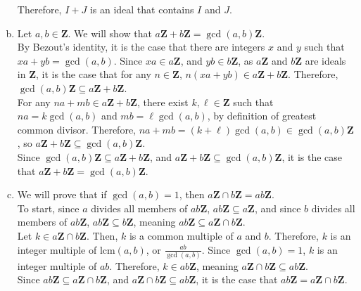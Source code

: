 \documentclass[9pt]{extarticle}
\begin{document}
\begin{enumerate}[(a)]
      Therefore, $I+J$ is an ideal that contains $I$ and $J$.
    \item Let $a,b\in\mathbf{Z}$. We will show that $a\mathbf{Z} + b\mathbf{Z} = \gcd(a,b)\mathbf{Z}$.\\

      By Bezout's identity, it is the case that there are integers $x$ and $y$ such that $xa + yb = \gcd(a,b)$. Since $xa\in a\mathbf{Z}$, and $yb\in b\mathbf{Z}$, as $a\mathbf{Z}$ and $b\mathbf{Z}$ are ideals in $\mathbf{Z}$, it is the case that for any $n\in\mathbf{Z}$, $n(xa + yb) \in a\mathbf{Z} + b\mathbf{Z}$. Therefore, $\gcd(a,b)\mathbf{Z}\subseteq a\mathbf{Z} + b\mathbf{Z}$.\\

      For any $na + mb\in a\mathbf{Z} + b\mathbf{Z}$, there exist $k,\ell\in \mathbf{Z}$ such that $na = k\gcd(a,b)$ and $mb = \ell\gcd(a,b)$, by definition of greatest common divisor. Therefore, $na + mb = (k+\ell)\gcd(a,b)\in \gcd(a,b)\mathbf{Z}$, so $a\mathbf{Z}+b\mathbf{Z}\subseteq \gcd(a,b)\mathbf{Z}$.\\

      Since $\gcd(a,b)\mathbf{Z}\subseteq a\mathbf{Z} + b\mathbf{Z}$, and $a\mathbf{Z} + b\mathbf{Z}\subseteq \gcd(a,b)\mathbf{Z}$, it is the case that $a\mathbf{Z} + b\mathbf{Z} = \gcd(a,b)\mathbf{Z}$.
    \item We will prove that if $\gcd(a,b) = 1$, then $a\mathbf{Z}\cap b\mathbf{Z} = ab\mathbf{Z}$.\\

      To start, since $a$ divides all members of $ab\mathbf{Z}$, $ab\mathbf{Z}\subseteq a\mathbf{Z}$, and since $b$ divides all members of $ab\mathbf{Z}$, $ab\mathbf{Z}\subseteq b\mathbf{Z}$, meaning $ab\mathbf{Z}\subseteq a\mathbf{Z}\cap b\mathbf{Z}$.\\

      Let $k\in a\mathbf{Z} \cap b\mathbf{Z}$. Then, $k$ is a common multiple of $a$ and $b$. Therefore, $k$ is an integer multiple of $\text{lcm}(a,b)$, or $\frac{ab}{\gcd(a,b)}$. Since $\gcd(a,b) = 1$, $k$ is an integer multiple of $ab$. Therefore, $k\in ab\mathbf{Z}$, meaning $a\mathbf{Z}\cap b\mathbf{Z}\subseteq ab\mathbf{Z}$.\\

      Since $ab\mathbf{Z}\subseteq a\mathbf{Z}\cap b\mathbf{Z}$, and $a\mathbf{Z}\cap b\mathbf{Z} \subseteq ab\mathbf{Z}$, it is the case that $ab\mathbf{Z} = a\mathbf{Z} \cap b\mathbf{Z}$.
  \end{enumerate}
\end{document}

